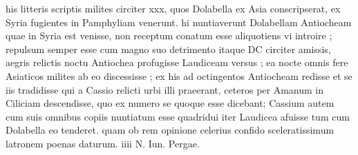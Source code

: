  his litteris scriptis milites circiter xxx, quos Dolabella ex Asia conscripserat, ex Syria fugientes in Pamphyliam venerunt. hi nuntiaverunt Dolabellam Antiocheam quae in Syria est venisse, non receptum conatum esse aliquotiens vi introire ; repulsum semper esse cum magno suo detrimento itaque DC circiter amissis, aegris relictis noctu Antiochea profugisse Laudiceam versus ; ea nocte omnis fere Asiaticos milites ab eo discessisse ; ex his ad octingentos Antiocheam redisse et se iis tradidisse qui a Cassio relicti urbi illi praeerant, ceteros per Amanum in Ciliciam descendisse, quo ex numero se quoque esse dicebant; Cassium autem cum suis omnibus copiis nuntiatum esse quadridui iter Laudicea afuisse tum cum Dolabella eo tenderet. quam ob rem opinione celerius confido sceleratissimum latronem poenas daturum. iiii N. Iun. Pergae.
